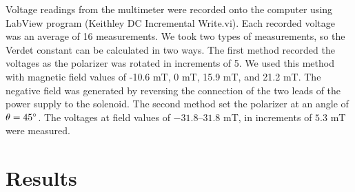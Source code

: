 \documentclass[prb,preprint]{revtex4-1}
\begin{document}
{Voltage readings from the multimeter were recorded onto the computer using LabView program (Keithley DC Incremental Write.vi). Each recorded voltage was an average of 16 measurements. We took two types of measurements, so the Verdet constant can be calculated in two ways.  The first method recorded the voltages as the polarizer was rotated in increments of 5\degree. We used this method with magnetic field values of -10.6 mT, 0 mT, 15.9 mT, and 21.2 mT. The negative field was generated by reversing the connection of the two leads of the power supply to the solenoid. The second method set the polarizer at an angle of $\theta = 45\degree$. The voltages at field values of $-31.8$--$31.8$ mT, in increments of $5.3$ mT were measured.
}


\section{Results}
\end{document}

